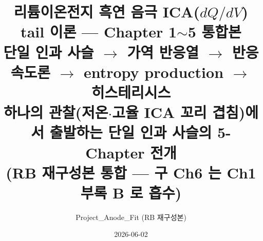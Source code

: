 \newcommand{\dd}{\mathrm{d}}
\newcommand{\eff}{\mathrm{eff}}
\newcommand{\eq}{\mathrm{eq}}
\newcommand{\app}{\mathrm{app}}
\newcommand{\drive}{\mathrm{drive}}
\newcommand{\bg}{\mathrm{bg}}
\newcommand{\cell}{\mathrm{cell}}
\newcommand{\ext}{\mathrm{ext}}
\newcommand{\OCV}{\mathrm{OCV}}
\newcommand{\tot}{\mathrm{tot}}
\newcommand{\irr}{\mathrm{irr}}
\newcommand{\rev}{\mathrm{rev}}
\newcommand{\rxn}{\mathrm{rxn}}
\newcommand{\kin}{\mathrm{kin}}
\newcommand{\ohm}{\mathrm{ohm}}
\newcommand{\conc}{\mathrm{conc}}
\newcommand{\src}{\mathrm{src}}
\newcommand{\loss}{\mathrm{loss}}
\newcommand{\amb}{\mathrm{amb}}
\newcommand{\rlx}{\mathrm{relax}}
\newcommand{\cand}{\mathrm{cand}}
\newcommand{\conv}{\mathrm{conv}}
\newcommand{\prog}{\mathrm{prog}}
\newcommand{\coord}{\mathrm{coord}}
\newcommand{\ct}{\mathrm{ct}}
\newcommand{\sstat}{\mathrm{ss}}
\newcommand{\resid}{\mathrm{resid}}
\newcommand{\film}{\mathrm{film}}
\newcommand{\obs}{\mathrm{obs}}
\newcommand{\trans}{\mathrm{tr}}
\newcommand{\site}{\mathrm{site}}
\newcommand{\curr}{\mathrm{curr}}
\newcommand{\transp}{\mathrm{transport}}
\newcommand{\tr}{\mathrm{tr}}
\newcommand{\chem}{\mathrm{chem}}
\newcommand{\dis}{\mathrm{dis}}
\newcommand{\chg}{\mathrm{ch}}
\newcommand{\rst}{\mathrm{rest}}
\newcommand{\hys}{\mathrm{hys}}
\newcommand{\pol}{\mathrm{pol}}
\newcommand{\tar}{\mathrm{tar}}
\newcommand{\stt}{\mathrm{state}}
\newcommand{\cb}{\mathrm{cb}}
\newcommand{\dyn}{\mathrm{dyn}}
\newcommand{\tol}{\mathrm{tol}}
\newcommand{\noise}{\mathrm{noise}}
\newcommand{\AL}[1]{\textsf{[AL-#1]}}
\newcommand{\brk}{\discretionary{}{}{}}%

\title{\textbf{리튬이온전지 흑연 음극 ICA($dQ/dV$) tail 이론 — Chapter 1$\sim$5 통합본}\\[0.5em]
\large 단일 인과 사슬 $\to$ 가역 반응열 $\to$ 반응속도론 $\to$ entropy production $\to$ 히스테리시스\\[0.3em]
\normalsize 하나의 관찰(저온$\cdot$고율 ICA 꼬리 겹침)에서 출발하는 단일 인과 사슬의 5-Chapter 전개\\
(RB 재구성본 통합 — 구 Ch6 는 Ch1 부록 B 로 흡수)}
\author{Project\_Anode\_Fit (RB 재구성본)}
\date{2026-06-02}


\sloppy
\maketitle

